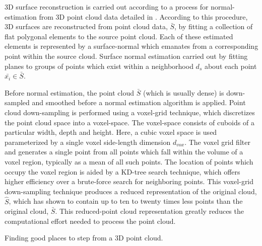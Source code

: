 			3D surface reconstruction is carried out according to a process for normal-estimation from 3D point cloud data detailed in \cite{Rusu2009}. According to this procedure, 3D surfaces are reconstructed from point cloud data, $\bar{S}$, by fitting a collection of flat polygonal elements to the source point cloud. Each of these estimated elements is represented by a surface-normal which emanates from a corresponding point within the source cloud. Surface normal estimation carried out by fitting planes to groups of points which exist within a neighborhood $d_{s}$ about each point $\bar{x_{i}}\in\bar{S}$.

			Before normal estimation, the point cloud $\bar{S}$ (which is usually dense) is down-sampled and smoothed before a normal estimation algorithm is applied. Point cloud down-sampling is performed using a voxel-grid technique, which discretizes the point cloud space into a voxel-space. The voxel-space consists of cuboids of a particular width, depth and height. Here, a cubic voxel space is used parameterized by a single voxel side-length dimension $d_{vox}$. The voxel grid filter and generates a single point from all points which fall within the volume of a voxel region, typically as a mean of all such points. The location of points which occupy the voxel region is aided by a KD-tree search technique, which offers higher efficiency over a brute-force search for neighboring points. This voxel-grid down-sampling technique produces a reduced representation of the original cloud, $\hat{S}$, which has shown to contain up to ten to twenty times less points than the original cloud, $\bar{S}$. This reduced-point cloud representation greatly reduces the computational effort needed to process the point cloud.
			
			\begin{algorithm}
				\begin{algorithmic}
						\EndIf
					\EndFor
				\end{algorithmic}	
				\caption{Finding good places to step from a 3D point cloud.}
				\label{alg::goodspacestostep}
			\end{algorithm}

